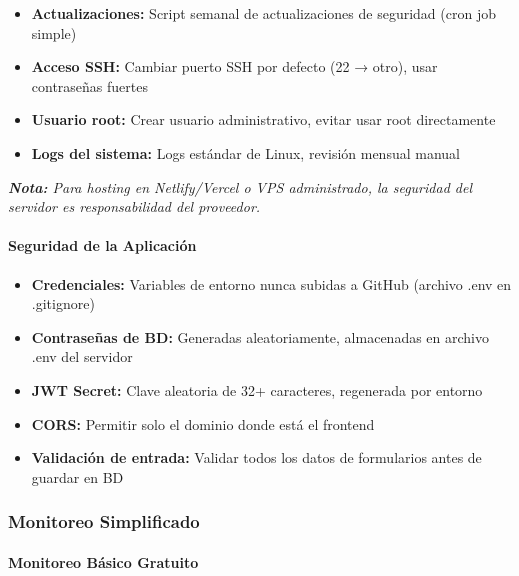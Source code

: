 \documentclass[12pt,a4paper]{article}
\begin{document}
\begin{itemize}[noitemsep]
    \item \textbf{Actualizaciones:} Script semanal de actualizaciones de seguridad (cron job simple)
    \item \textbf{Acceso SSH:} Cambiar puerto SSH por defecto (22 → otro), usar contraseñas fuertes
    \item \textbf{Usuario root:} Crear usuario administrativo, evitar usar root directamente
    \item \textbf{Logs del sistema:} Logs estándar de Linux, revisión mensual manual
\end{itemize}

\textit{\textbf{Nota:} Para hosting en Netlify/Vercel o VPS administrado, la seguridad del servidor es responsabilidad del proveedor.}

\paragraph{Seguridad de la Aplicación}

\begin{itemize}[noitemsep]
    \item \textbf{Credenciales:} Variables de entorno nunca subidas a GitHub (archivo .env en .gitignore)
    \item \textbf{Contraseñas de BD:} Generadas aleatoriamente, almacenadas en archivo .env del servidor
    \item \textbf{JWT Secret:} Clave aleatoria de 32+ caracteres, regenerada por entorno
    \item \textbf{CORS:} Permitir solo el dominio donde está el frontend
    \item \textbf{Validación de entrada:} Validar todos los datos de formularios antes de guardar en BD
\end{itemize}

\subsubsection{Monitoreo Simplificado}

\paragraph{Monitoreo Básico Gratuito}
\end{document}
